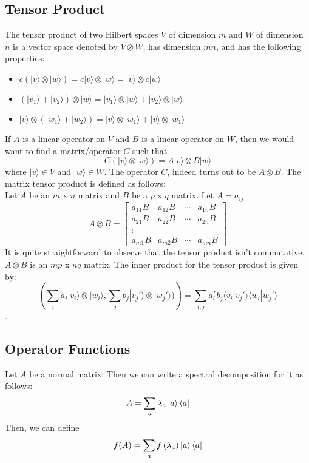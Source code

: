 \documentclass{article}
\begin{document}
\subsection{Tensor Product}
The tensor product of two Hilbert spaces $V$ of dimension $m$ and $W$ of dimension $n$ is a vector space denoted by $V \otimes W$, has dimension $mn$, and has the following properties:
\begin{itemize}
\item $c(|v \rangle \otimes |w \rangle) = c|v \rangle \otimes |w \rangle = |v \rangle \otimes c|w \rangle$
\item $(|v_1 \rangle + |v_2 \rangle ) \otimes |w \rangle = |v_1 \rangle \otimes |w \rangle + |v_2 \rangle \otimes |w \rangle$
\item $|v \rangle \otimes (|w_1 \rangle + |w_2 \rangle ) = |v \rangle \otimes |w_1 \rangle + |v \rangle \otimes |w_1 \rangle$
\end{itemize}
If $A$ is a linear operator on $V$ and $B$ is a linear operator on $W$, then we would want to find a matrix/operator $C$ such that $$C(|v \rangle \otimes |w \rangle) = A|v \rangle \otimes B|w \rangle$$ where $|v \rangle \in V$ and $|w \rangle \in W$. The operator $C$, indeed turns out to be $A \otimes B$. The matrix tensor product is defined as follows:\\[5pt]
Let $A$ be an $m$ x $n$ matrix and $B$ be a $p$ x $q$ matrix. Let $A = {a_{ij}}$. $$A \otimes B = 
\begin{bmatrix}
a_{11}B & a_{12}B & \cdots & a_{1n}B \\
a_{21}B & a_{22}B & \cdots & a_{2n}B \\
\vdots \\
a_{m1}B & a_{m2}B & \cdots & a_{mn}B
\end{bmatrix}$$
It is quite straightforward to observe that the tensor product isn't commutative.
$A \otimes B$ is an $mp$ x $nq$ matrix. The inner product for the tensor product is given by:
$$\left(\sum_i a_i |v_i \rangle \otimes |w_i \rangle , \sum_j b_j |v_j '\rangle \otimes |w_j ' \rangle) \right) = \sum_{i, j} a_i ^{*} b_j \langle v_i|v_j ' \rangle \langle w_i|w_j ' \rangle $$.

\subsection{Operator Functions}
Let $A$ be a normal matrix. Then we can write a spectral decomposition for it as follows:
$$A = \sum_{a} \lambda_a \ket{a} \bra{a}$$
Then, we can define $$f(A) = \sum_{a} f\left( \lambda_a \right) \ket{a} \bra{a}$$
\end{document}
